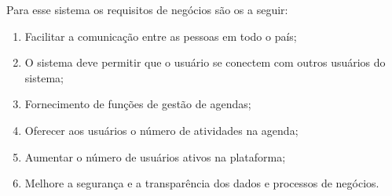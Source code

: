 Para esse sistema os requisitos de negócios são os a seguir:
\vspace{1em}
\begin{enumerate}
  \item Facilitar a comunicação entre as pessoas em todo o país;
  \item O sistema deve permitir que o usuário se conectem com outros usuários do sistema;
  \item Fornecimento de funções de gestão de agendas;
  \item Oferecer aos usuários o número de atividades na agenda;
  \item Aumentar o número de usuários ativos na plataforma;
  \item Melhore a segurança e a transparência dos dados e processos de negócios.
\end{enumerate}
